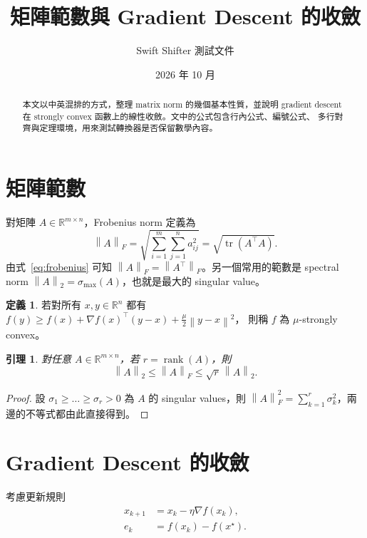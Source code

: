 \documentclass[11pt]{ctexart}
\title{矩陣範數與 Gradient Descent 的收斂}
\author{Swift Shifter 測試文件}
\date{2026 年 10 月}
\newtheorem{lemma}[theorem]{引理}
\theoremstyle{definition}
\newtheorem{definition}[theorem]{定義}
\newcommand{\R}{\mathbb{R}}
\newcommand{\norm}[1]{\left\lVert #1 \right\rVert}
\DeclareMathOperator{\tr}{tr}
\begin{document}
\maketitle

\begin{abstract}
本文以中英混排的方式，整理 matrix norm 的幾個基本性質，並說明 gradient
descent 在 strongly convex 函數上的線性收斂。文中的公式包含行內公式、編號公式、
多行對齊與定理環境，用來測試轉換器是否保留數學內容。
\end{abstract}

\section{矩陣範數}

對矩陣 $A \in \R^{m \times n}$，Frobenius norm 定義為
\begin{equation}
  \norm{A}_F = \sqrt{\sum_{i=1}^{m} \sum_{j=1}^{n} a_{ij}^2} = \sqrt{\tr(A^\top A)}.
  \label{eq:frobenius}
\end{equation}
由式~\eqref{eq:frobenius} 可知 $\norm{A}_F = \norm{A^\top}_F$。另一個常用的範數是
spectral norm $\norm{A}_2 = \sigma_{\max}(A)$，也就是最大的 singular value。

\begin{definition}
若對所有 $x, y \in \R^n$ 都有 $f(y) \ge f(x) + \nabla f(x)^\top (y - x) + \frac{\mu}{2}\norm{y - x}^2$，
則稱 $f$ 為 $\mu$-strongly convex。
\end{definition}

\begin{lemma}\label{lem:norms}
對任意 $A \in \R^{m \times n}$，若 $r = \operatorname{rank}(A)$，則
\[
  \norm{A}_2 \le \norm{A}_F \le \sqrt{r}\, \norm{A}_2 .
\]
\end{lemma}

\begin{proof}
設 $\sigma_1 \ge \dots \ge \sigma_r > 0$ 為 $A$ 的 singular values，則
$\norm{A}_F^2 = \sum_{k=1}^{r} \sigma_k^2$，兩邊的不等式都由此直接得到。
\end{proof}

\section{Gradient Descent 的收斂}

考慮更新規則
\begin{align}
  x_{k+1} &= x_k - \eta \nabla f(x_k), \label{eq:gd}\\
  e_k     &= f(x_k) - f(x^\star). \nonumber
\end{align}
\end{document}

